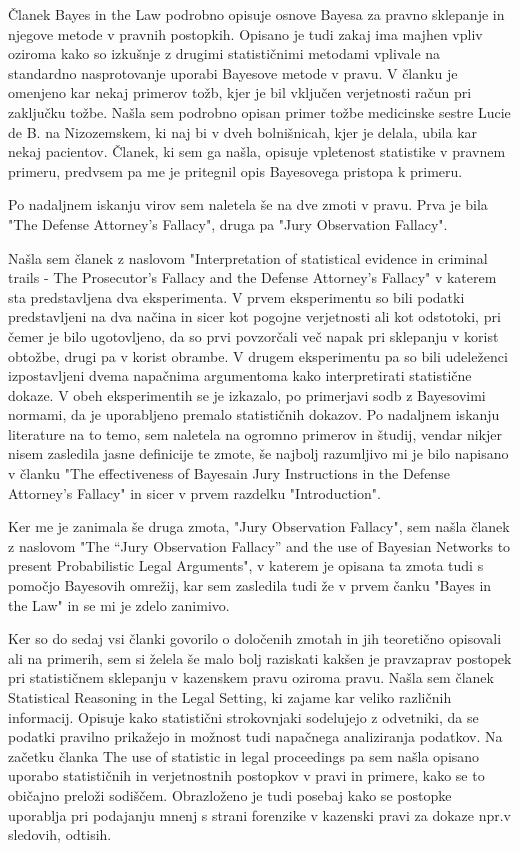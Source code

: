 \documentclass[a4paper,12pt]{article}
\begin{document}
Članek Bayes in the Law podrobno opisuje osnove Bayesa za pravno sklepanje in njegove metode v pravnih postopkih. 
Opisano je tudi zakaj ima majhen vpliv oziroma kako so izkušnje z drugimi statističnimi metodami vplivale na standardno 
nasprotovanje uporabi Bayesove metode v pravu. V članku je omenjeno kar nekaj primerov tožb, kjer je bil vključen verjetnosti račun 
pri zaključku tožbe. Našla sem podrobno opisan primer tožbe medicinske sestre Lucie de B. na Nizozemskem, ki naj bi v dveh bolnišnicah, 
kjer je delala, ubila kar nekaj pacientov. Članek, ki sem ga našla, opisuje vpletenost statistike v pravnem primeru, predvsem pa me je pritegnil
opis Bayesovega pristopa k primeru.

Po nadaljnem iskanju virov sem naletela še na dve zmoti v pravu. Prva je bila "The Defense Attorney's Fallacy", druga pa "Jury Observation Fallacy". 

Našla sem članek z naslovom "Interpretation of statistical evidence in criminal trails - The Prosecutor's Fallacy and the Defense Attorney's Fallacy" v 
katerem sta predstavljena dva eksperimenta. V prvem eksperimentu so bili podatki predstavljeni na dva načina in sicer kot pogojne verjetnosti ali kot odstotoki, 
pri čemer je bilo ugotovljeno, da so prvi povzorčali več napak pri sklepanju v korist obtožbe, drugi pa v korist obrambe. V drugem eksperimentu pa so bili udeleženci 
izpostavljeni dvema napačnima argumentoma kako interpretirati statistične dokaze. V obeh eksperimentih se je izkazalo, po primerjavi sodb z Bayesovimi normami, da je 
uporabljeno premalo statističnih dokazov.
Po nadaljnem iskanju literature na to temo, sem naletela na ogromno primerov in študij, vendar nikjer nisem zasledila jasne definicije te zmote, še najbolj razumljivo mi je 
bilo napisano v članku "The effectiveness of Bayesain Jury Instructions in the Defense Attorney's Fallacy" in sicer v prvem razdelku "Introduction". 

Ker me je zanimala še druga zmota, "Jury Observation Fallacy", sem našla članek z naslovom "The “Jury Observation Fallacy” and the use of Bayesian Networks to present 
Probabilistic Legal Arguments", v katerem je opisana ta zmota tudi s pomočjo Bayesovih omrežij, kar sem zasledila tudi že v prvem čanku "Bayes in the Law" 
in se mi je zdelo zanimivo.

Ker so do sedaj vsi članki govorilo o določenih zmotah in jih teoretično opisovali ali na primerih, sem si želela še malo bolj raziskati kakšen je pravzaprav 
postopek pri statističnem sklepanju v kazenskem pravu oziroma pravu. Našla sem članek Statistical Reasoning in the Legal Setting, ki zajame kar veliko 
različnih informacij. Opisuje kako statistični strokovnjaki sodelujejo z odvetniki, da se podatki pravilno prikažejo in možnost tudi napačnega analiziranja podatkov.
Na začetku članka The use of statistic in legal proceedings pa sem našla opisano uporabo statističnih in verjetnostnih postopkov v pravi in primere, 
kako se to običajno preloži sodiščem. Obrazloženo je tudi posebaj kako se postopke uporablja pri podajanju mnenj s strani forenzike v kazenski pravi za 
dokaze npr.v sledovih, odtisih.
\end{document}
